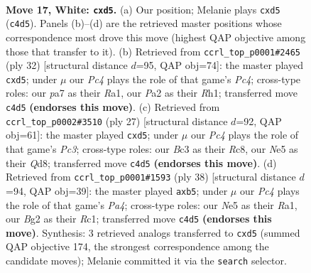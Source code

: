 \documentclass[11pt]{article}
\begin{document}
\clearpage

\begin{figure}[p]\centering
\begin{subfigure}{0.46\textwidth}\centering
\resizebox{\linewidth}{!}{%
\newchessgame
\chessboard[
  setfen={rnb1q1k1/pp2r1pp/2p5/3pNp1n/2P5/2B1P1P1/P4PBP/1R1QR1K1 w - - 0 17},
  showmover=false,
  pgfstyle=straightmove, color=movearrow, markmove={c4-d5}
]}
\caption{}
\end{subfigure}\hfill
\begin{subfigure}{0.46\textwidth}\centering
\resizebox{\linewidth}{!}{%
\newchessgame
\chessboard[
  setfen={1nb2rk1/2q2ppp/1r2pn2/2pp4/2P2PP1/1PQ5/1B1NP1BP/R3K2R w KQ - 0 17},
  showmover=false,
  pgfstyle=straightmove, color=movearrow, markmove={c4-d5}
]}
\caption{}
\end{subfigure}
\\[4pt]
\begin{subfigure}{0.46\textwidth}\centering
\resizebox{\linewidth}{!}{%
\newchessgame
\chessboard[
  setfen={2rq1rk1/p2n1ppp/b1p1p3/Pp1P4/3Pn3/1P3NP1/1Q2PPBP/RNR3K1 b - - 0 14},
  showmover=false,
  pgfstyle=straightmove, color=movearrow, markmove={c6-d5}
]}
\caption{}
\end{subfigure}\hfill
\begin{subfigure}{0.46\textwidth}\centering
\resizebox{\linewidth}{!}{%
\newchessgame
\chessboard[
  setfen={r3r1k1/3n2pp/bqp1pp2/pp6/P1nP2PB/1Q1N4/4PPBP/R1R3K1 w - - 3 20},
  showmover=false,
  pgfstyle=straightmove, color=movearrow, markmove={a4-b5}
]}
\caption{}
\end{subfigure}
\caption{\textbf{Move 17, White: \texttt{cxd5}.} (a) Our position; Melanie plays \texttt{cxd5} (\texttt{c4d5}). Panels (b)--(d) are the retrieved master positions whose correspondence most drove this move (highest QAP objective among those that transfer to it). (b) Retrieved from \texttt{ccrl\_top\_p0001\#2465} (ply 32) [structural distance $d$=95, QAP obj=74]: the master played \texttt{cxd5}; under $\mu$ our \emph{Pc4} plays the role of that game's \emph{Pc4}; cross-type roles: our \emph{p}a7 as their \emph{R}a1, our \emph{P}a2 as their \emph{R}h1; transferred move \texttt{c4d5} \textbf{(endorses this move)}. (c) Retrieved from \texttt{ccrl\_top\_p0002\#3510} (ply 27) [structural distance $d$=92, QAP obj=61]: the master played \texttt{cxd5}; under $\mu$ our \emph{Pc4} plays the role of that game's \emph{Pc3}; cross-type roles: our \emph{B}c3 as their \emph{R}c8, our \emph{N}e5 as their \emph{Q}d8; transferred move \texttt{c4d5} \textbf{(endorses this move)}. (d) Retrieved from \texttt{ccrl\_top\_p0001\#1593} (ply 38) [structural distance $d$=94, QAP obj=39]: the master played \texttt{axb5}; under $\mu$ our \emph{Pc4} plays the role of that game's \emph{Pa4}; cross-type roles: our \emph{N}e5 as their \emph{R}a1, our \emph{B}g2 as their \emph{R}c1; transferred move \texttt{c4d5} \textbf{(endorses this move)}. Synthesis: 3 retrieved analogs transferred to \texttt{cxd5} (summed QAP objective 174, the strongest correspondence among the candidate moves); Melanie committed it via the \texttt{search} selector.}
\label{fig:thought-m32}
\end{figure}
\end{document}
